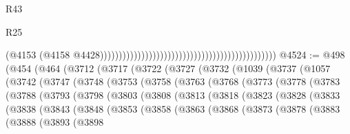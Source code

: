 \begin{lexlean}{R43}
\begin{lexlean}{R25}
\begin{coremodule}
{{{{{{{{{{{{{{{{{{{{{{{{{{{{{{{{{{{{{{{{{{{{{{{{{{{{{{{{{{{{{{{{{{{{{{{{{{{{{{{{{{{{{{{{{{{{{{{{{{{{{{{{{{{{{{{{{{{{{{{{{{{{{{{{{{{{{{{{{{{{{{{{{{{{{{{{{{{{{{{{{{{{{{{{{{{{{{{{{{{{{{{{{{{{{{{{{                                                                                              (@4153
                                                                                                (@4158
                                                                                                  @4428)))))))))))))))))))))))))))))))))))))))))))))))
@4524 := @498
    (@454
      (@464
        (@3712
          (@3717
            (@3722
              (@3727
                (@3732
                  (@1039
                    (@3737
                      (@1057
                        (@3742
                          (@3747
                            (@3748
                              (@3753
                                (@3758
                                  (@3763
                                    (@3768
                                      (@3773
                                        (@3778
                                          (@3783
                                            (@3788
                                              (@3793
                                                (@3798
                                                  (@3803
                                                    (@3808
                                                      (@3813
                                                        (@3818
                                                          (@3823
                                                            (@3828
                                                              (@3833
                                                                (@3838
                                                                  (@3843
                                                                    (@3848
                                                                      (@3853
                                                                        (@3858
                                                                          (@3863
                                                                            (@3868
                                                                              (@3873
                                                                                (@3878
                                                                                  (@3883
                                                                                    (@3888
                                                                                      (@3893
                                                                                        (@3898
}}}}}}}}}}}}}}}}}}}}}}}}}}}}}}}}}}}}}}}}}}}}}}}}}}}}}}}}}}}}}}}}}}}}}}}}}}}}}}}}}}}}}}}}}}}}}}}}}}}}}}}}}}}}}}}}}}}}}}}}}}}}}}}}}}}}}}}}}}}}}}}}}}}}}}}}}}}}}}}}}}}}}}}}}}}}}}}}}}}}}}}}}}}}}}}}}
\end{coremodule}
\end{lexlean}
\end{lexlean}
